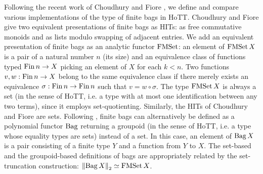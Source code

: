 \documentclass[a4paper,USenglish,cleveref]{lipics-v2021}
\begin{document}
Following the recent work of Choudhury and Fiore \cite{Choudhury2021}, we define and compare various implementations of the type of finite bags in HoTT. Choudhury and Fiore give two equivalent presentations of finite bags as HITs: as free commutative monoids and as lists modulo swapping of adjacent entries. We add an equivalent presentation of finite bags as an analytic functor $\FMSet$: an element of $\FMSet X$ is a pair of a natural number $n$ (its size) and an equivalence class of functions typed $\Fin n \to X$ picking an element of $X$ for each $k < n$. Two functions $v ,w :\Fin n \to X$ belong to the same equivalence class if there merely exists an equivalence $\sigma : \Fin n \to \Fin n$ such that $v = w \circ \sigma$. The type $\FMSet X$ is always a set (in the sense of HoTT, i.e. a type with at most one identification between any two terms), since it employs set-quotienting. Similarly, the HITs of Choudhury and Fiore are sets. Following \cite{Kock2012}, finite bags can alternatively be defined as a polynomial functor $\Bag$ returning a groupoid (in the sense of HoTT, i.e. a type whose equality types are sets) instead of a set. In this case, an element of $\Bag X$ is a pair consisting of a finite type $Y$ and a function from $Y$ to $X$. The set-based and the groupoid-based definitions of bags are appropriately related by the set-truncation construction: $\SetTrunc{\Bag X} \simeq \FMSet X$.
\end{document}
